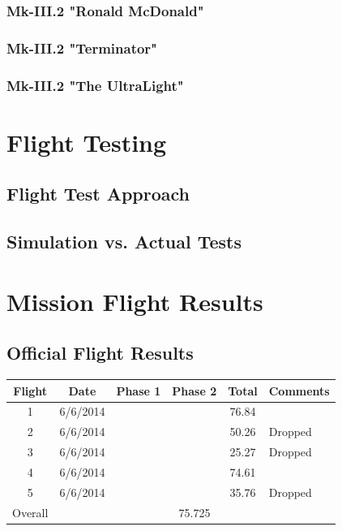 \documentclass[11pt]{article}
\begin{document}
\subsubsection{Mk-III.2 "Ronald McDonald"}
\label{mk3.2}
\subsubsection{Mk-III.2 "Terminator"}
\label{mk3.3}
\subsubsection{Mk-III.2 "The UltraLight"}
\label{mk3.4}

\section{Flight Testing}
\label{FlightTesting}
\subsection{Flight Test Approach}
\label{FltTstAppr}
\subsection{Simulation vs. Actual Tests}
\label{simvsact}

\section{Mission Flight Results}
\label{MissionFlightResults}
\subsection{Official Flight Results}
\label{OffFltRes}
\begin{center}
    \begin{tabular}{ | c | c | c | c | c | p{3cm} |}
    \hline
    \textbf{Flight} & \textbf{Date} & \textbf{Phase 1} & \textbf{Phase 2} & \textbf{Total} & \textbf{Comments} \\ \hline
    1 & 6/6/2014 &  &  & 76.84 & \\ \hline
    2 & 6/6/2014 &  &  & 50.26 & Dropped\\ \hline
    3 & 6/6/2014 &  &  & 25.27 & Dropped\\ \hline
    4 & 6/6/2014 &  &  & 74.61 & \\ \hline
    5 & 6/6/2014 &  &  & 35.76 & Dropped\\ \hline
    Overall & \multicolumn{5}{c|}{75.725}\\ \hline   
    \end{tabular}
\end{center}
\end{document}
